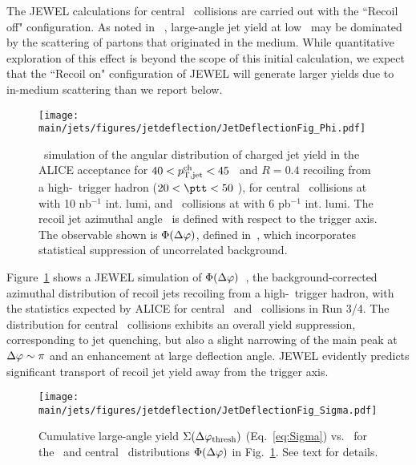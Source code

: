 The JEWEL calculations for central \PbPb\ collisions are carried out with the ``Recoil off" configuration. As noted in ~\cite{DEramo:2018eoy}, large-angle jet yield at low \ptjet\ may be dominated by the scattering of partons that originated in the medium. While quantitative exploration of this effect is beyond the scope of this initial calculation, we expect that the ``Recoil on" configuration of JEWEL will generate larger yields due to in-medium scattering than we report below.

\begin{figure}[tbh!]
\centering
\texttt{[image: \\main/jets/figures/jetdeflection/JetDeflectionFig\_Phi.pdf]}
\caption{\jewel\ simulation of the angular distribution of charged jet yield in the ALICE acceptance for  $40<p_{\mathrm{T,jet}}^{\mathrm{ch}}<45$ \gevc\ and $R=0.4$ recoiling from a high-\pt\ trigger hadron ($20<\ptt<50$ \gevc), for central \PbPb\ collisions at  with 10 nb$^{-1}$ int. lumi, and \pp\ collisions at  with 6 pb$^{-1}$ int. lumi. The recoil jet azimuthal angle \Dphi\ is defined with respect to the trigger axis. The observable shown is $\Phi(\Delta\varphi)$, defined in~\cite{Adam:2015doa}, which incorporates statistical suppression of uncorrelated background.
}
\label{fig:JetDeflectionPhi}
\end{figure}

Figure~\ref{fig:JetDeflectionPhi} shows a JEWEL simulation of $\Phi(\Delta\varphi)$~\cite{Adam:2015doa}, the background-corrected azimuthal distribution of recoil jets recoiling from a high-\pT\ trigger hadron, with the statistics expected by ALICE for central \PbPb\ and \pp\ collisions in Run 3/4. The distribution for central \PbPb\ collisions exhibits an overall yield suppression, corresponding to jet quenching, but also a slight narrowing of the main peak at $\Delta\varphi\sim\pi$ and an enhancement at large deflection angle. JEWEL evidently predicts significant transport of recoil jet yield away from the trigger axis.

\begin{figure}[tbh!]
\centering
\texttt{[image: \\main/jets/figures/jetdeflection/JetDeflectionFig\_Sigma.pdf]}
\caption{Cumulative large-angle yield $\Sigma(\Delta\varphi_{\mathrm{thresh}})$ (Eq.~\ref{eq:Sigma}) vs. \dphithresh\ for the \pp\ and central \PbPb\ distributions $\Phi(\Delta\varphi)$ in Fig.~\ref{fig:JetDeflectionPhi}. See text for details. 
}
\label{fig:JetDeflectionSigma}
\end{figure}

